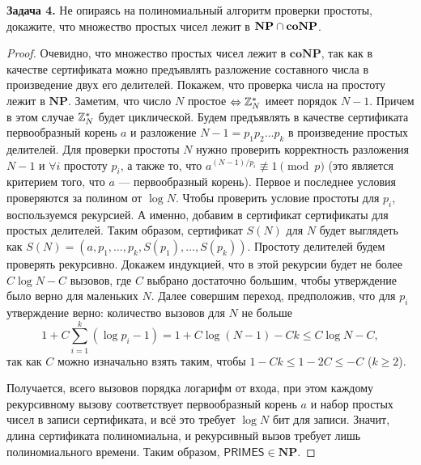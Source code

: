 \textbf{Задача 4.}  Не опираясь на полиномиальный алгоритм проверки простоты, докажите, что множество простых чисел лежит в $\textbf{NP} \cap \textbf{coNP}$.

\begin{proof} Очевидно, что множество простых чисел лежит в $\mathbf{coNP}$, так как в качестве сертификата можно предъявлять разложение составного числа в произведение двух его делителей. Покажем, что проверка числа на простоту лежит в $\mathbf{NP}$. Заметим, что число $N$ простое $\Leftrightarrow \mathbb{Z}_{N}^*$ имеет порядок $N - 1$. Причем в этом случае $\mathbb{Z}_{N}^*$ будет циклической. Будем предъявлять в качестве сертификата первообразный корень $a$ и разложение $N - 1 = p_{1}p_{2} \dots p_{k}$ в произведение простых делителей. Для проверки простоты $N$ нужно проверить корректность разложения $N - 1$ и $\forall i$ простоту $p_i$, а также то, что $a^{(N - 1) / p_i} \not\equiv 1 \pmod{p}$ (это является критерием того, что $a$ --- первообразный корень). Первое и последнее условия проверяются за полином от $\log{N}$. Чтобы проверить условие простоты для $p_i$, воспользуемся рекурсией. А именно, добавим в сертификат сертификаты для простых делителей. Таким образом, сертификат $S(N)$ для $N$ будет выглядеть как $S(N) = (a, p_1, \dots, p_k, S(p_1), \dots, S(p_k))$. Простоту делителей будем проверять рекурсивно. Докажем индукцией, что в этой рекурсии будет не более $C \log{N} - C$ вызовов, где $C$ выбрано достаточно большим, чтобы утверждение было верно для маленьких $N$. Далее совершим переход, предположив, что для $p_i$ утверждение верно: количество вызовов для $N$ не больше
\[
1 + C \sum_{i=1}^k (\log{p_i} - 1) = 1 + C \log{(N - 1)} - Ck \le C\log{N} - C,
\]
так как $C$ можно изначально взять таким, чтобы $1 - Ck \le 1 - 2C \le -C$ ($k \ge 2$).

Получается, всего вызовов порядка логарифм от входа, при этом каждому рекурсивному вызову соответствует первообразный корень $a$ и набор простых чисел в записи сертификата, и всё это требует $\log{N}$ бит для записи. Значит, длина сертификата полиномиальна, и рекурсивный вызов требует лишь полиномиального времени. Таким образом, $\mathsf{PRIMES} \in \mathbf{NP}$.

\end{proof}